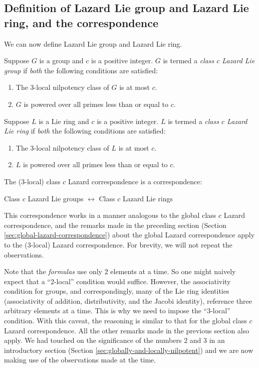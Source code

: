 \documentclass{ucetd}
\begin{document}
\subsection{Definition of Lazard Lie group and Lazard Lie ring, and the correspondence}

We can now define Lazard Lie group and Lazard Lie ring.

\begin{definer}
  Suppose $G$ is a group and $c$ is a positive integer. $G$ is termed
  a {\em class $c$ Lazard Lie group} if {\em both} the following
  conditions are satisfied:

  \begin{enumerate}
  \item The $3$-local nilpotency class of $G$ is at most $c$.
  \item $G$ is powered over all primes less than or equal to $c$.
  \end{enumerate}
\end{definer}

\begin{definer}
  Suppose $L$ is a Lie ring and $c$ is a positive integer. $L$ is
  termed a {\em class $c$ Lazard Lie ring} if {\em both} the
  following conditions are satisfied:

  \begin{enumerate}
  \item The $3$-local nilpotency class of $L$ is at most $c$.
  \item $L$ is powered over all primes less than or equal to $c$.
  \end{enumerate}
\end{definer}

The ($3$-local) class $c$ Lazard correspondence is a correspondence:

\begin{center}
  Class $c$ Lazard Lie groups $\leftrightarrow$ Class $c$ Lazard Lie
  rings
\end{center}

This correspondence works in a manner analogous to the global class $c$ Lazard
correspondence, and the remarks made in the preceding section (Section
\ref{sec:global-lazard-correspondence}) about the global Lazard
correspondence apply to the ($3$-local) Lazard correspondence. For
brevity, we will not repeat the observations.

Note that the {\em formulas} use only $2$ elements at a time. So one
might naively expect that a ``$2$-local'' condition would
suffice. However, the associativity condition for groups, and
correspondingly, many of the Lie ring identities (associativity of
addition, distributivity, and the Jacobi identity), reference three
arbitrary elements at a time. This is why we need to impose the
``$3$-local'' condition. With this caveat, the reasoning is similar to
that for the global class $c$ Lazard correspondence. All the other
remarks made in the previous section also apply. We had touched on the
significance of the numbers $2$ and $3$ in an introductory section
(Section \ref{sec:globally-and-locally-nilpotent}) and we are now
making use of the observations made at the time.
\end{document}
